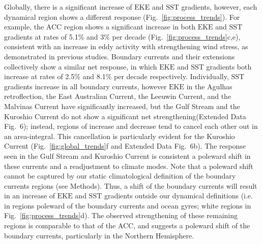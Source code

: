 \documentclass{nature}
\newcommand{\EKE}{\text{EKE}}
\newcommand{\SST}{\text{SST}}
\begin{document}
Globally, there is a significant increase of $\EKE$ and $\SST$ gradients, however, each dynamical region shows a different response (Fig.~\ref{fig:process_trends}). For example, the ACC region shows a significant increase in both $\EKE$ and $\SST$ gradients at rates of 5.1\% and 3\% per decade (Fig.~\ref{fig:process_trends}c,e), consistent with an increase in eddy activity with strengthening wind stress, as demonstrated in previous studies\cite{Meredith_Sensitivity_2012,Hogg_Recent_2015,Martinez_TKE_2019}. Boundary currents and their extensions collectively show a similar net response, in which $\EKE$ and $\SST$ gradients both increase at rates of 2.5\% and 8.1\% per decade respectively. Individually, $\SST$ gradients increase in all boundary currents, however $\EKE$ in the Agulhas retroflection, the East Australian Current, the Leeuwin Current, and the Malvinas Current have significantly increased, but the Gulf Stream and the Kuroshio Current do not show a significant net strengthening\cite{Ezer_Gulf_Stream_2013,Uchida_Kuroshio_2008}(Extended Data Fig.~6); instead, regions of increase and decrease tend to cancel each other out in an area-integral. This cancellation is particularly evident for the Kuroshio Current (Fig.~\ref{fig:global_trends}f and  Extended Data Fig.~6b). The response seen in the Gulf Stream and Kuroshio Current is consistent a poleward shift in these currents\cite{Wu_shift_2020,Yang_intensification_2016, Wu_warming_2012} and a readjustment to climate modes\cite{Piecuch_Fcurrent_2020}. Note that a poleward shift cannot be captured by our static climatological definition of the boundary currents regions (see Methods). Thus,  a shift of the boundary currents will result in an increase of $\EKE$ and $\SST$ gradients outside our dynamical definitions (i.e. in regions poleward of the boundary currents and ocean gyres; white regions in Fig.~\ref{fig:process_trends}d). The observed strengthening of these remaining regions is comparable to that of the ACC, and suggests a poleward shift of the boundary currents, particularly in the Northern Hemisphere. 
\end{document}
